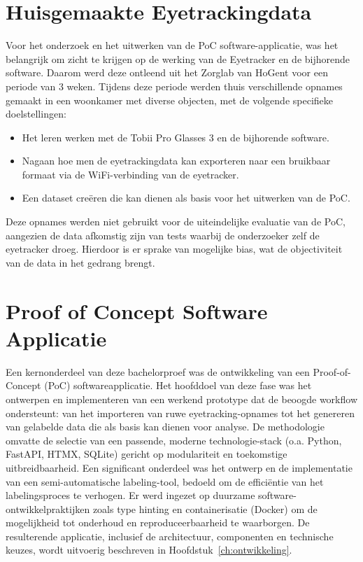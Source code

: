 \section{Huisgemaakte Eyetrackingdata}

Voor het onderzoek en het uitwerken van de PoC software-applicatie, was het belangrijk om zicht te krijgen op de werking van de Eyetracker en de bijhorende software.
Daarom werd deze ontleend uit het Zorglab van HoGent voor een periode van 3 weken. 
Tijdens deze periode werden thuis verschillende opnames gemaakt in een woonkamer met diverse objecten, met de volgende specifieke doelstellingen:
\begin{itemize}
    \item Het leren werken met de Tobii Pro Glasses 3 en de bijhorende software.
    \item Nagaan hoe men de eyetrackingdata kan exporteren naar een bruikbaar formaat via de WiFi-verbinding van de eyetracker.
    \item Een dataset creëren die kan dienen als basis voor het uitwerken van de PoC.
\end{itemize}
Deze opnames werden niet gebruikt voor de uiteindelijke evaluatie van de PoC, aangezien de data afkomstig zijn van tests waarbij de onderzoeker zelf de eyetracker droeg.
Hierdoor is er sprake van mogelijke bias, wat de objectiviteit van de data in het gedrang brengt.

\section{Proof of Concept Software Applicatie}

Een kernonderdeel van deze bachelorproef was de ontwikkeling van een Proof-of-Concept (PoC) softwareapplicatie. 
Het hoofddoel van deze fase was het ontwerpen en implementeren van een werkend prototype dat de beoogde workflow ondersteunt: van het importeren van ruwe eyetracking-opnames tot het genereren van gelabelde data die als basis kan dienen voor analyse. 
De methodologie omvatte de selectie van een passende, moderne technologie-stack (o.a. Python, FastAPI, HTMX, SQLite) gericht op modulariteit en toekomstige uitbreidbaarheid. 
Een significant onderdeel was het ontwerp en de implementatie van een semi-automatische labeling-tool, bedoeld om de efficiëntie van het labelingsproces te verhogen. 
Er werd ingezet op duurzame software-ontwikkelpraktijken zoals type hinting en containerisatie (Docker) om de mogelijkheid tot onderhoud en reproduceerbaarheid te waarborgen. 
De resulterende applicatie, inclusief de architectuur, componenten en technische keuzes, wordt uitvoerig beschreven in Hoofdstuk~\ref{ch:ontwikkeling}.

